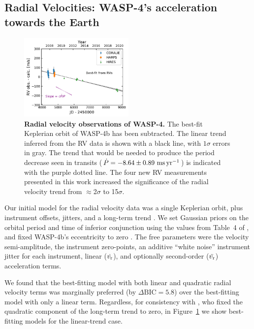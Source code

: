 \documentclass[12pt,twocolumn,tighten]{aastex62}
\begin{document}
\subsection{Radial Velocities: WASP-4's acceleration towards the Earth}

\begin{figure}[t]
	\begin{center}
		\leavevmode
		\includegraphics[width=0.5\textwidth]{f2.pdf}
	\end{center}
	\vspace{-0.7cm}
	\caption{
    {\bf Radial velocity observations of WASP-4.} The best-fit
    Keplerian orbit of WASP-4b has been subtracted.  The linear trend
    inferred from the RV data is shown with a black line, with
    $1\sigma$ errors in gray.  The trend that would be needed to
    produce the period decrease seen in transits ($\dot{P}= - 8.64 \pm
    0.89~{\rm ms}\,{\rm yr}^{-1}$) is indicated with the purple dotted
    line.  The four new RV measurements presented in this work
    increased the significance of the radial velocity trend from
    $\approx$2$\sigma$ to 15$\sigma$.
	\label{fig:rvs}
  \vspace{-0.3cm}
	}
\end{figure}

Our initial model for the radial velocity data was a single Keplerian
orbit, plus instrument offsets, jitters, and a long-term trend
\citep[][\texttt{radvel}]{fulton_radvel_2018}.  We set Gaussian priors
on the orbital period and time of inferior conjunction using the
values from Table~4 of , and fixed
WASP-4b's eccentricity to zero
\citep{beerer_secondary_2011,knutson_friends_2014,bonomo_gaps_2017}.
The free parameters were the velocity semi-amplitude, the instrument
zero-points, an additive ``white noise'' instrument jitter for each
instrument, linear ($\dot{v_{\rm r}}$), and optionally second-order
($\ddot{v_{\rm r}}$) acceleration terms.

We found that the best-fitting model with both linear and quadratic
radial velocity terms was marginally preferred (by $\Delta
\mathrm{BIC} = 5.8$) over the best-fitting model with only a linear
term.  Regardless, for consistency with \citet{knutson_friends_2014},
who fixed the quadratic component of the long-term trend to zero, in
Figure~\ref{fig:rvs} we show best-fitting models for the linear-trend
case.  
\end{document}
